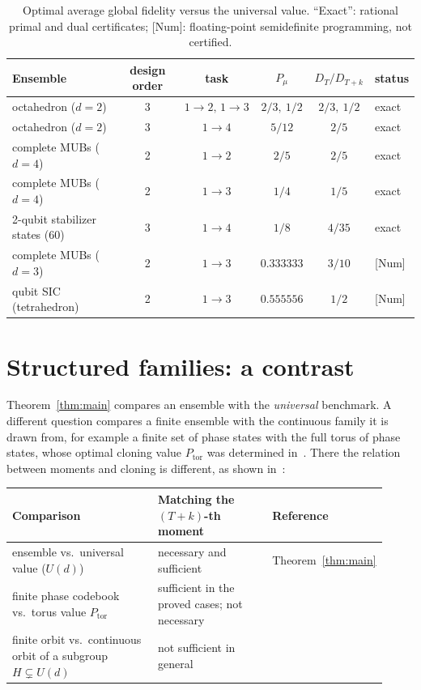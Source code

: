 \documentclass[11pt]{article}
\newcommand{\Ptor}{P_{\mathrm{tor}}}
\theoremstyle{definition}
\theoremstyle{remark}
\begin{document}
\begin{table}[ht]
\centering\small
\caption{Optimal average global fidelity versus the universal value. ``Exact'': rational primal and dual
certificates; [Num]: floating-point semidefinite programming, not certified.}\label{tab:cert}
\begin{tabular}{@{}lccccl@{}}\toprule
Ensemble & design order & task & $P_\mu$ & $D_T/D_{T+k}$ & status\\\midrule
octahedron ($d=2$) & 3 & $1\to2,\,1\to3$ & $2/3,\ 1/2$ & $2/3,\ 1/2$ & exact\\
octahedron ($d=2$) & 3 & $1\to4$ & $5/12$ & $2/5$ & exact\\
complete MUBs ($d=4$) & 2 & $1\to2$ & $2/5$ & $2/5$ & exact\\
complete MUBs ($d=4$) & 2 & $1\to3$ & $1/4$ & $1/5$ & exact\\
2-qubit stabilizer states (60) & 3 & $1\to4$ & $1/8$ & $4/35$ & exact\\
complete MUBs ($d=3$) & 2 & $1\to3$ & $0.333333$ & $3/10$ & [Num]\\
qubit SIC (tetrahedron) & 2 & $1\to3$ & $0.555556$ & $1/2$ & [Num]\\\bottomrule
\end{tabular}
\end{table}

\section{Structured families: a contrast}\label{sec:contrast}
Theorem~\ref{thm:main} compares an ensemble with the \emph{universal} benchmark. A different question compares a
finite ensemble with the continuous family it is drawn from, for example a finite set of phase states with the full
torus of phase states, whose optimal cloning value $\Ptor$ was determined in~\cite[Thm.~II.3, Eq.~(16)]{Herasymenko2026}. There the
relation between moments and cloning is different, as shown in~\cite{Weldon2026}:

\begin{center}\small
\begin{tabular}{@{}p{0.42\linewidth}p{0.33\linewidth}p{0.17\linewidth}@{}}\toprule
Comparison & Matching the $(T+k)$-th moment & Reference\\\midrule
ensemble vs.\ universal value ($U(d)$) & necessary and sufficient & Theorem~\ref{thm:main}\\
finite phase codebook vs.\ torus value $\Ptor$ & sufficient in the proved cases; not necessary & \cite[Thm.~9, \S5.4]{Weldon2026}\\
finite orbit vs.\ continuous orbit of a subgroup $H\subsetneq U(d)$ & not sufficient in general & \cite[Thm.~31]{Weldon2026}\\\bottomrule
\end{tabular}
\end{center}
\end{document}
